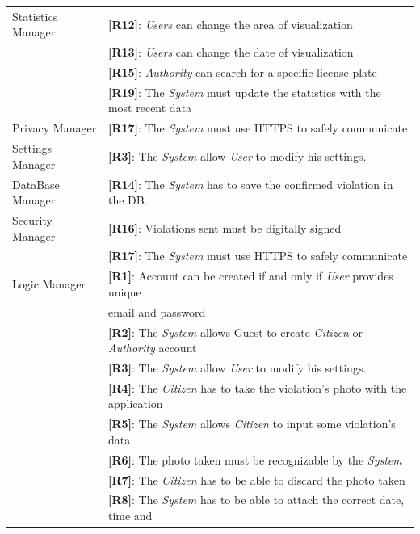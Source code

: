 \documentclass{article}
\begin{document}
\begin{center}
\begin{tabular}{ | l | l |}
        \hline
        Statistics Manager & \textbf{[R12]}: \textit{Users} can change the area of visualization \\
                           & \textbf{[R13]}: \textit{Users} can change the date of visualization \\
                           & \textbf{[R15]}: \textit{Authority} can search for a specific license plate \\
                           & \textbf{[R19]}: The \textit{System} must update the statistics with the most recent data \\
        \hline
        Privacy Manager & \textbf{[R17]}: The \textit{System} must use HTTPS to safely communicate \\
        \hline 
        Settings Manager & \textbf{[R3]}: The \textit{System} allow \textit{User} to modify his settings. \\
        \hline
        DataBase Manager & \textbf{[R14]}: The \textit{System} has to save the confirmed violation in the DB. \\
        \hline
        Security Manager & \textbf{[R16]}: Violations sent must be digitally signed \\
                         & \textbf{[R17]}: The \textit{System} must use HTTPS to safely communicate \\
        \hline
        Logic Manager   & \textbf{[R1]}: Account can be created if and only if \textit{User} provides unique \\ 
                        & email and password \\
                        & \textbf{[R2]}: The \textit{System} allows Guest to create \textit{Citizen} or \textit{Authority} account \\
                        & \textbf{[R3]}: The \textit{System} allow \textit{User} to modify his settings. \\
                        & \textbf{[R4]}: The \textit{Citizen} has to take the violation’s photo with the application \\
                        & \textbf{[R5]}: The \textit{System} allows \textit{Citizen} to input some violation’s data \\
                        & \textbf{[R6]}: The photo taken must be recognizable by the \textit{System} \\
                        & \textbf{[R7]}: The \textit{Citizen} has to be able to discard the photo taken \\
                        & \textbf{[R8]}: The \textit{System} has to be able to attach the correct date, time and \\ 

\end{tabular}
\end{center}
\end{document}
